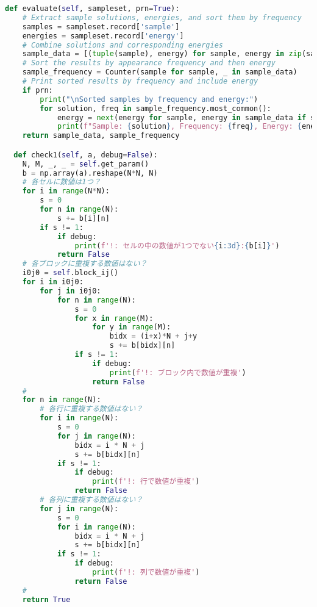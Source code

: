 \documentclass[uplatex,dvipdfmx,a4paper,11pt,oneside,openany]{jsbook}
\begin{document}
\begin{lstlisting}[language=Python]
  def evaluate(self, sampleset, prn=True):
    # Extract sample solutions, energies, and sort them by frequency
    samples = sampleset.record['sample']
    energies = sampleset.record['energy']
    # Combine solutions and corresponding energies
    sample_data = [(tuple(sample), energy) for sample, energy in zip(samples, energies)]
    # Sort the results by appearance frequency and then energy
    sample_frequency = Counter(sample for sample, _ in sample_data)
    # Print sorted results by frequency and include energy
    if prn:
        print("\nSorted samples by frequency and energy:")
        for solution, freq in sample_frequency.most_common():
            energy = next(energy for sample, energy in sample_data if sample == solution)
            print(f"Sample: {solution}, Frequency: {freq}, Energy: {energy:+.2f}")
    return sample_data, sample_frequency

  def check1(self, a, debug=False):
    N, M, _, _ = self.get_param()
    b = np.array(a).reshape(N*N, N)
    # 各セルに数値は1つ？
    for i in range(N*N):
        s = 0
        for n in range(N):
            s += b[i][n]
        if s != 1:
            if debug:
                print(f'!: セルの中の数値が1つでない{i:3d}:{b[i]}')
            return False
    # 各ブロックに重複する数値はない？
    i0j0 = self.block_ij()
    for i in i0j0:
        for j in i0j0:
            for n in range(N):
                s = 0
                for x in range(M):
                    for y in range(M):
                        bidx = (i+x)*N + j+y
                        s += b[bidx][n]
                if s != 1:
                    if debug:
                        print(f'!: ブロック内で数値が重複')
                    return False
    #
    for n in range(N):
        # 各行に重複する数値はない？
        for i in range(N):
            s = 0
            for j in range(N):
                bidx = i * N + j
                s += b[bidx][n]
            if s != 1:
                if debug:
                    print(f'!: 行で数値が重複')
                return False
        # 各列に重複する数値はない？
        for j in range(N):
            s = 0
            for i in range(N):
                bidx = i * N + j
                s += b[bidx][n]
            if s != 1:
                if debug:
                    print(f'!: 列で数値が重複')
                return False
    #
    return True


\end{lstlisting}
\end{document}
